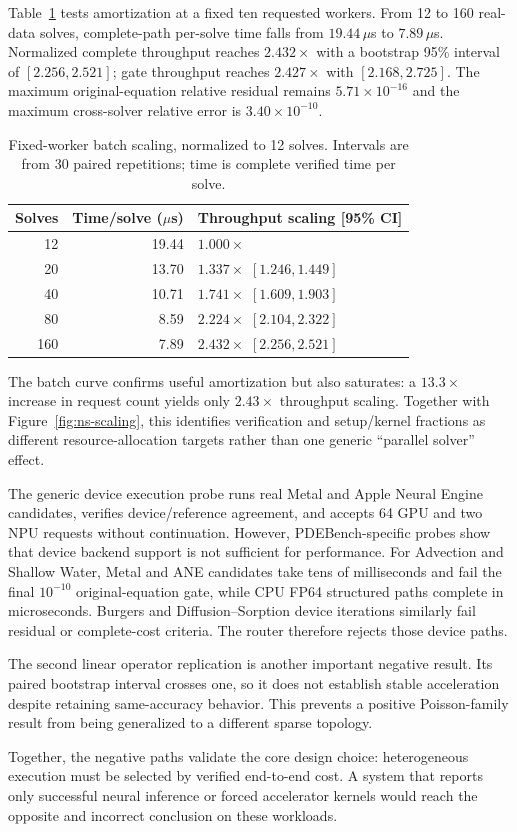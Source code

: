 Table~\ref{tab:ns-batch} tests amortization at a fixed ten requested workers. From
12 to 160 real-data solves, complete-path per-solve time falls from $19.44\,\mu$s
to $7.89\,\mu$s. Normalized complete throughput reaches $2.432\times$ with a
bootstrap 95\% interval of $[2.256,2.521]$; gate throughput reaches
$2.427\times$ with $[2.168,2.725]$. The maximum original-equation relative
residual remains $5.71\times10^{-16}$ and the maximum cross-solver relative error
is $3.40\times10^{-10}$.

\begin{table}[t]
\centering
\footnotesize
\caption{Fixed-worker batch scaling, normalized to 12 solves. Intervals are from
30 paired repetitions; time is complete verified time per solve.}
\label{tab:ns-batch}
\begin{tabular}{rrl}
\toprule
Solves & Time/solve ($\mu$s) & Throughput scaling [95\% CI] \\
\midrule
12 & 19.44 & $1.000\times$ \\
20 & 13.70 & $1.337\times$ $[1.246,1.449]$ \\
40 & 10.71 & $1.741\times$ $[1.609,1.903]$ \\
80 & 8.59 & $2.224\times$ $[2.104,2.322]$ \\
160 & 7.89 & $2.432\times$ $[2.256,2.521]$ \\
\bottomrule
\end{tabular}
\end{table}

The batch curve confirms useful amortization but also saturates: a $13.3\times$
increase in request count yields only $2.43\times$ throughput scaling. Together
with Figure~\ref{fig:ns-scaling}, this identifies verification and setup/kernel
fractions as different resource-allocation targets rather than one generic
``parallel solver'' effect.

The generic device execution probe runs real Metal and Apple Neural Engine
candidates, verifies device/reference agreement, and accepts 64 GPU and two NPU
requests without continuation. However, PDEBench-specific probes show that device
backend support is not sufficient for performance. For Advection and Shallow Water,
Metal and ANE candidates take tens of milliseconds and fail the final $10^{-10}$
original-equation gate, while CPU FP64 structured paths complete in microseconds.
Burgers and Diffusion--Sorption device iterations similarly fail residual or
complete-cost criteria. The router therefore rejects those device paths.

The second linear operator replication is another important negative result. Its
paired bootstrap interval crosses one, so it does not establish stable acceleration
despite retaining same-accuracy behavior. This prevents a positive Poisson-family
result from being generalized to a different sparse topology.

Together, the negative paths validate the core design choice: heterogeneous
execution must be selected by verified end-to-end cost. A system that reports only
successful neural inference or forced accelerator kernels would reach the opposite
and incorrect conclusion on these workloads.
